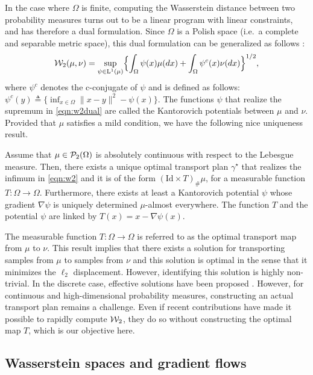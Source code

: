 In the case where $\Omega$ is finite, computing the Wasserstein distance between two probability measures turns out to be  a linear program with linear constraints, and has therefore a dual formulation. Since $\Omega$ is a Polish space (i.e.\ a complete and separable metric space), this dual formulation can be generalized as follows \cite[Theorem 5.10]{villani2008optimal}:
\begin{align}
{\cal W}_2(\mu,\nu) = \sup_{\psi \in \mathrm{L}^1(\mu)} \Bigl\{ \int_\Omega \psi(x) \mu(dx) + \int_\Omega \psi^c(x) \nu(dx) \Bigr\}^{1/2}, \label{eqn:w2dual}
\end{align}
where $\psi^c$ denotes the c-conjugate of $\psi$ and is defined as follows: $\psi^c(y) \triangleq \{ \inf_{x\in \Omega} \| x-y\|^2 - \psi(x)\}$. The functions $\psi$ that realize the supremum in \eqref{eqn:w2dual} are called the Kantorovich potentials between $\mu$ and $\nu$.
%
Provided that $\mu$ satisfies a mild condition, we have the following nice uniqueness result.
\begin{thm}
\label{thm:unqmap}
Assume that  $\mu\in {\cal P}_2(\Omega)$ is absolutely continuous with respect to the Lebesgue measure. Then, there exists a unique optimal transport plan $\gamma^\star$ that realizes the infimum in \eqref{eqn:w2} and it is of the form $(\text{Id} \times T)_\# \mu$, for a measurable function $T : \Omega \to \Omega$. Furthermore, there exists at least a Kantorovich potential $\psi$ whose gradient $\nabla \psi$ is uniquely determined $\mu$-almost everywhere. The function $T$ and the potential $\psi$ are linked by $T(x) = x- \nabla \psi(x)$.
\end{thm}
The measurable function $T : \Omega \to \Omega$ is referred to as the optimal transport map from $\mu$ to $\nu$. 
This result implies that there exists a solution for transporting samples from $\mu$ to samples from $\nu$ and this solution is optimal in the sense that it minimizes the $\ell_2$ displacement. However, identifying this solution is highly non-trivial. In the discrete case, effective solutions have been proposed \cite{cuturi2013sinkhorn}. However, for continuous and high-dimensional probability measures, constructing an actual transport plan remains a challenge. Even if recent contributions \cite{genevay2016stochastic} have made it possible to rapidly compute ${\cal W}_2$, they do so without constructing the optimal map $T$, which is our objective here.


\subsection{Wasserstein spaces and gradient flows}

